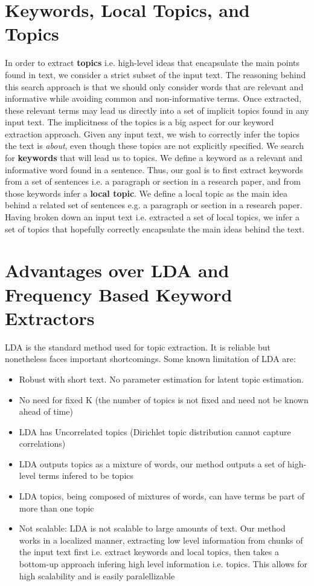 \documentclass[12pt]{article}
\begin{document}
\section{Keywords, Local Topics, and Topics}
In order to extract \textbf{topics} i.e. high-level ideas that encapsulate the main points found in text, we consider a strict subset of the input text.
The reasoning behind this search approach is that we should only consider words that are relevant and informative while avoiding common and non-informative terms.
Once extracted, these relevant terms may lead us directly into a set of implicit topics found in any input text. The implicitness of the topics is a big aspect for
our keyword extraction approach. Given any input text, we wish to correctly infer the topics the text is \textit{about}, even though these topics are not
explicitly specified.
We search for \textbf{keywords} that will lead us to topics. We define a keyword as a relevant and informative word found in a sentence. Thus, our goal
is to first extract keywords from a set of sentences i.e. a paragraph or section in a research paper, and from those keywords infer a \textbf{local topic}.
We define a local topic as the main idea behind a related set of sentences e.g. a paragraph or section in a research paper. Having broken down an input text
i.e. extracted a set of local topics, we infer a set of topics that hopefully correctly encapsulate the main ideas behind the text.
\section{Advantages over LDA and Frequency Based Keyword Extractors}
LDA is the standard method used for topic extraction. It is reliable but nonetheless faces important shortcomings. Some known limitation of LDA are:
\begin{itemize}
\item Robust with short text. No parameter estimation for latent topic estimation.
\item No need for fixed K (the number of topics is not fixed and need not be known ahead of time)
\item LDA has Uncorrelated topics (Dirichlet topic distribution cannot capture correlations)
\item LDA outputs topics as a mixture of words, our method outputs a set of high-level terms infered to be topics
\item LDA topics, being composed of mixtures of words, can have terms be part of more than one topic
\item Not scalable: LDA is not scalable to large amounts of text. Our method works in a localized manner, extracting low level information from
chunks of the input text first i.e. extract keywords and local topics, then takes a bottom-up approach infering high level information i.e. topics.
This allows for high scalability and is easily paralellizable
\end{itemize}
\end{document}
